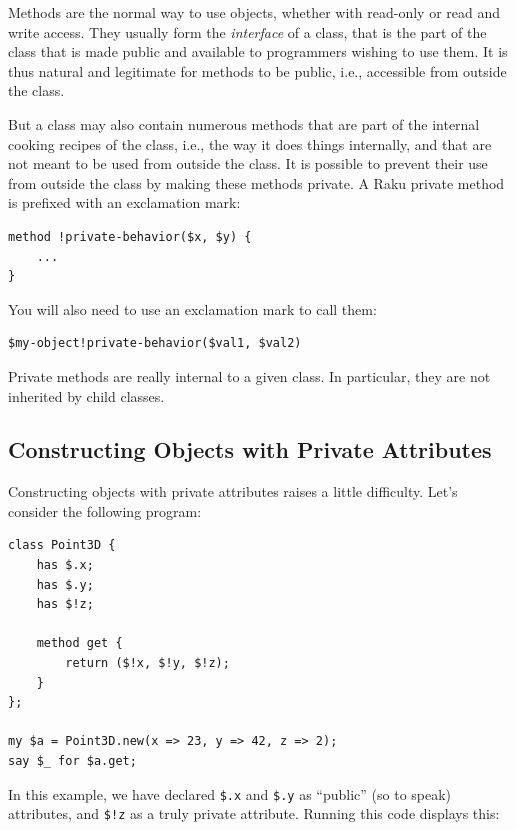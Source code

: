 Methods are the normal way to use objects, whether with read-only 
or read and write access. They usually form the \emph{interface} 
of a class, that is the part of the class that is made public 
and available to programmers wishing to use them. It is thus 
natural and legitimate for methods to be public, i.e., accessible 
from outside the class.

But a class may also contain numerous methods that are part 
of the internal cooking recipes of the class, i.e., the way it does 
things internally, and that are not 
meant to be used from outside the class. It is possible to prevent 
their use from outside the class by making these methods private. 
A Raku private method is prefixed with an exclamation mark:

\begin{verbatim}
method !private-behavior($x, $y) {
    ...
}
\end{verbatim}

You will also need to use an exclamation mark to call them:

\begin{verbatim}
$my-object!private-behavior($val1, $val2)
\end{verbatim}

Private methods are really internal to a given class. In 
particular, they are not inherited by child classes.


\subsection{Constructing Objects with Private Attributes}

Constructing objects with private attributes raises a 
little difficulty. Let's consider the following program:

\begin{verbatim}
class Point3D {
    has $.x;
    has $.y;
    has $!z;
    
    method get {
        return ($!x, $!y, $!z);
    }
};

my $a = Point3D.new(x => 23, y => 42, z => 2);
say $_ for $a.get;
\end{verbatim}

In this example, we have declared \verb'$.x' and \verb'$.y' 
as ``public'' (so to speak) attributes, and \verb'$!z' as 
a truly private attribute. Running this code displays this:

